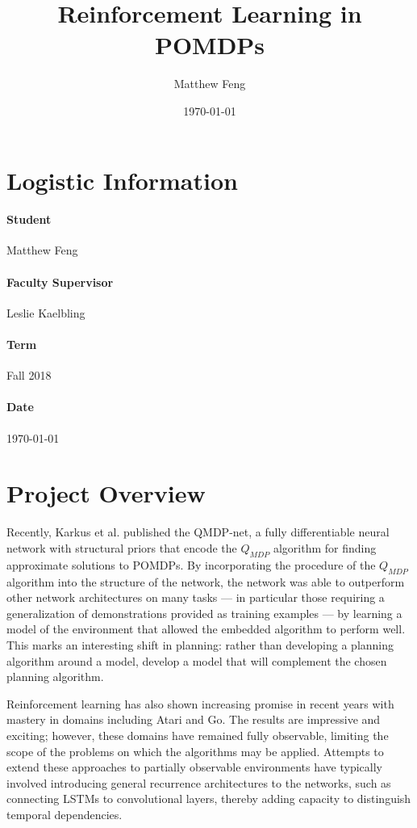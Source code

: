 \documentclass{article}[11pt]
\title{Reinforcement Learning in POMDPs}
\author{Matthew Feng}
\date{\today}
\begin{document}
\maketitle

\section{Logistic Information}
\paragraph{Student} Matthew Feng
\vspace{-1em}
\paragraph{Faculty Supervisor} Leslie Kaelbling
\vspace{-1em}
\paragraph{Term} Fall 2018
\vspace{-1em}
\paragraph{Date} \today

\section{Project Overview}
Recently, Karkus et al. \cite{KarkusHL17} 
published the QMDP-net, a fully differentiable
neural network with structural priors that encode the 
$Q_{MDP}$ algorithm for finding approximate
solutions to POMDPs. By incorporating the procedure of
the $Q_{MDP}$ algorithm into the structure of the
network, the network was able to outperform other
network architectures on many tasks --- in particular
those requiring a generalization of demonstrations
provided as training examples --- by learning a
model of the environment that allowed the embedded algorithm
to perform well. This marks an interesting shift
in planning: rather than developing a planning algorithm
around a model, develop a model that will complement
the chosen planning algorithm.

Reinforcement learning has also shown increasing
promise in recent years with mastery in domains
including Atari and Go. The results are
impressive and exciting; however, these
domains have remained fully observable, limiting
the scope of the problems on which the algorithms
may be applied. Attempts to extend these
approaches to partially observable environments
\cite{DBLP:journals/corr/HausknechtS15} have typically
involved introducing general recurrence
architectures to the networks, such as connecting
LSTMs to convolutional layers, thereby adding
capacity to distinguish temporal dependencies.
\end{document}
